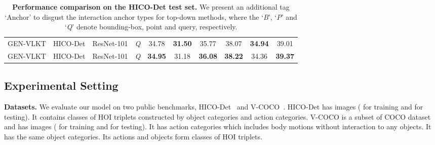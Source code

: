 \documentclass[10pt,twocolumn,letterpaper]{article}
\begin{document}
\begin{table*}[!t]
\begin{center}
{\begin{tabular}{cccc|ccc|ccc}
  \cellcolor{mygray-bg}GEN-VLKT		& \cellcolor{mygray-bg}HICO-Det		&\cellcolor{mygray-bg}ResNet-101	&\cellcolor{mygray-bg}\emph{Q}				&\cellcolor{mygray-bg}34.78	&\cellcolor{mygray-bg}\textbf{31.50}	&\cellcolor{mygray-bg}35.77      &\cellcolor{mygray-bg}38.07	&\cellcolor{mygray-bg}\textbf{34.94}	&\cellcolor{mygray-bg}39.01\\
    \cellcolor{mygray-bg}GEN-VLKT		&	\cellcolor{mygray-bg}HICO-Det	&\cellcolor{mygray-bg}ResNet-101	&\cellcolor{mygray-bg}\emph{Q}				&\cellcolor{mygray-bg}\textbf{34.95}	&\cellcolor{mygray-bg}31.18	&\cellcolor{mygray-bg}\textbf{36.08}       &\cellcolor{mygray-bg}\textbf{38.22}	&\cellcolor{mygray-bg}34.36	&\cellcolor{mygray-bg}\textbf{39.37}\\
  \hline           
  \end{tabular}}
  \end{center}
  \vspace{-3mm}
  \caption{\textbf{Performance comparison on the HICO-Det test set.} We present an additional tag `Anchor' to disgust the interaction anchor types for top-down methods, where the `\emph{B}', `\emph{P}' and `\emph{Q}' denote bounding-box, point and query, respectively.}
  \label{tb:hico}
  \vspace{-3mm}
  \end{table*}
  
\vspace{-1mm}\subsection{Experimental Setting}\label{sec:setting}\vspace{-1mm}
\noindent\textbf{Datasets.} We evaluate our model on two public benchmarks, HICO-Det~\cite{chao2018learning} and V-COCO~\cite{gupta2015visual}. HICO-Det has  images ( for training and  for testing). It contains  classes of HOI triplets constructed by  object categories and  action categories. V-COCO is a subset of COCO dataset and has  images ( for training and  for testing). It has  action categories which includes  body motions without interaction to any objects. It has the same  object categories. Its actions and objects form  classes of HOI triplets.
\end{document}
